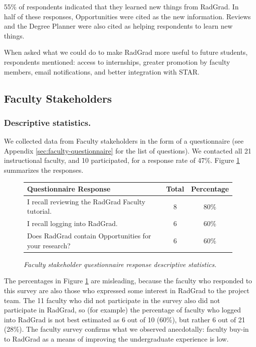 \documentclass[acmsmall]{acmart}
\begin{document}
55\% of respondents indicated that they learned new things from RadGrad. In half of these responses, Opportunities were cited as the new information. Reviews and the Degree Planner were also cited as helping respondents to learn new things.

When asked what we could do to make RadGrad more useful to future students, respondents mentioned: access to internships, greater promotion by faculty members, email notifications, and better integration with STAR.

\subsection{Faculty Stakeholders}

\subsubsection{Descriptive statistics.} We collected data from Faculty stakeholders in the form of a questionnaire (see Appendix \ref{sec:faculty-questionnaire} for the list of questions). We contacted all 21 instructional faculty, and 10 participated, for a response rate of 47\%.  Figure \ref{fig:faculty-questionnaire-responses} summarizes the responses.

\begin{figure}[th]
\centering
\small
\begin{tabular}{ p{4in} c c }
\hline
 Questionnaire Response &  Total & Percentage   \\
\hline
I recall reviewing the RadGrad Faculty tutorial. & 8 & 80\% \\
I recall logging into RadGrad.                   & 6 & 60\% \\
Does RadGrad contain Opportunities for your research?  & 6 & 60\% \\
\hline
\end{tabular}
\caption{\em Faculty stakeholder questionnaire response descriptive statistics.}
\normalsize
\label{fig:faculty-questionnaire-responses}
\end{figure}

The percentages in Figure \ref{fig:faculty-questionnaire-responses} are misleading, because the faculty who responded to this survey are also those who expressed some interest in RadGrad to the project team. The 11 faculty who did not participate in the survey also did not participate in RadGrad, so (for example) the percentage of faculty who logged into RadGrad is not best estimated as 6 out of 10 (60\%), but rather 6 out of 21 (28\%).  The faculty survey confirms what we observed anecdotally: faculty buy-in to RadGrad as a means of improving the undergraduate experience is low.
\end{document}
